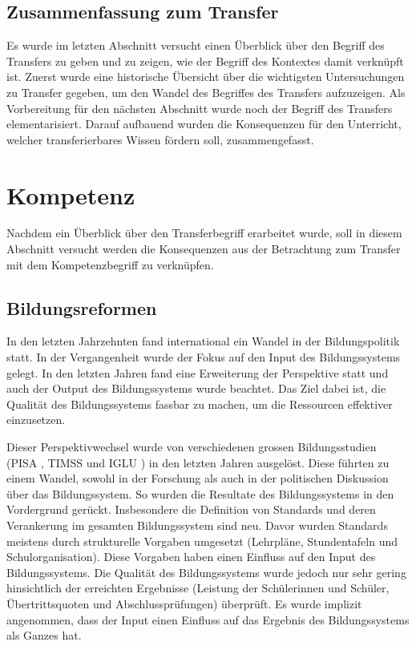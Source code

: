 \subsection{Zusammenfassung zum Transfer}

Es wurde im letzten Abschnitt versucht einen Überblick über den Begriff des Transfers zu geben und zu zeigen, wie der Begriff des Kontextes damit verknüpft ist. Zuerst wurde eine historische Übersicht über die wichtigsten Untersuchungen zu Transfer gegeben, um den Wandel des Begriffes des Transfers aufzuzeigen.  Als Vorbereitung für den nächsten Abschnitt wurde noch der Begriff des Transfers elementarisiert. Darauf aufbauend wurden die Konsequenzen für den Unterricht, welcher transferierbares Wissen fördern soll, zusammengefasst. 



\section{Kompetenz}

Nachdem ein Überblick über den Transferbegriff erarbeitet wurde, soll in diesem Abschnitt versucht werden die Konsequenzen aus der Betrachtung zum Transfer mit dem Kompetenzbegriff zu verknüpfen.

\subsection{Bildungsreformen}
In den letzten Jahrzehnten fand international ein Wandel in der Bildungspolitik statt. In der Vergangenheit wurde der Fokus auf den Input des Bildungssystems gelegt. In den letzten Jahren fand eine Erweiterung der Perspektive statt und auch der Output des Bildungssystems wurde beachtet. Das Ziel dabei ist, die Qualität des Bildungssystems fassbar zu machen, um die Ressourcen effektiver einzusetzen.

Dieser Perspektivwechsel wurde von verschiedenen grossen Bildungsstudien (PISA \citep{PISA-KonsortiumDeuschland2004}, TIMSS \citep{Martin2003} und IGLU \citep{Bos2003}) in den letzten Jahren ausgelöst. Diese führten zu einem Wandel, sowohl in der Forschung als auch in der politischen Diskussion über das Bildungssystem. So wurden die Resultate des Bildungssystems in den Vordergrund gerückt. Insbesondere die Definition von Standards und deren Verankerung im gesamten Bildungssystem sind neu. Davor wurden Standards meistens durch strukturelle Vorgaben umgesetzt (Lehrpläne, Stundentafeln und Schulorganisation). Diese Vorgaben haben einen Einfluss auf den Input des Bildungssystems. Die Qualität des Bildungssystems wurde jedoch nur sehr gering hinsichtlich der erreichten Ergebnisse (Leistung der Schülerinnen und Schüler, Übertrittsquoten und Abschlussprüfungen) überprüft. Es wurde implizit angenommen, dass der Input einen Einfluss auf das Ergebnis des Bildungssystems als Ganzes hat. 

